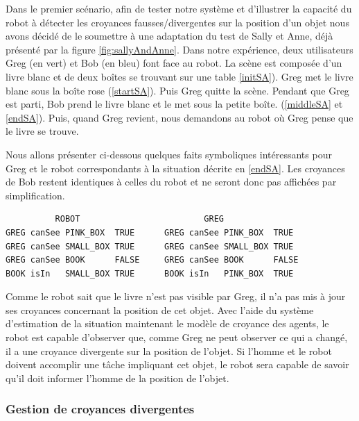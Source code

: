 \documentclass[a4paper,11pt,twoside]{StyleThese}
\begin{document}
Dans le premier scénario, afin de tester notre système et d'illustrer la capacité du robot à détecter les croyances fausses/divergentes sur la position d'un objet nous avons décidé de le soumettre à une adaptation du test de Sally et Anne, déjà présenté par la figure \ref{fig:sallyAndAnne}. Dans notre expérience, deux utilisateurs Greg (en vert) et Bob (en bleu) font face au robot.
La scène est composée d'un livre blanc et de deux boîtes se trouvant sur une table \ref{initSA}).
Greg met le livre blanc sous la boîte rose (\ref{startSA}). Puis Greg quitte la scène. Pendant que Greg est parti, Bob prend le livre blanc et le met sous la petite boîte. (\ref{middleSA} et \ref{endSA}).
Puis, quand Greg revient, nous demandons au robot où Greg pense que le livre se trouve.





Nous allons présenter ci-dessous quelques faits symboliques intéressants pour Greg et le robot correspondants à la situation décrite en \ref{endSA}. Les croyances de Bob restent identiques à celles du robot et ne seront donc pas affichées par simplification.
\begin{scriptsize}
\begin{verbatim}
          ROBOT                         GREG
GREG canSee PINK_BOX  TRUE      GREG canSee PINK_BOX  TRUE
GREG canSee SMALL_BOX TRUE      GREG canSee SMALL_BOX TRUE
GREG canSee BOOK      FALSE     GREG canSee BOOK      FALSE
BOOK isIn   SMALL_BOX TRUE      BOOK isIn   PINK_BOX  TRUE

\end{verbatim}
\end{scriptsize}

Comme le robot sait que le livre n'est pas visible par Greg, il n'a pas mis à jour ses croyances concernant la position de cet objet. Avec l'aide du système d'estimation de la situation maintenant le modèle de croyance des agents, le robot est capable d'observer que, comme Greg ne peut observer ce qui a changé, il a une croyance divergente sur la position de l'objet. Si l'homme et le robot doivent accomplir une tâche impliquant cet objet, le robot sera capable de savoir qu'il doit informer l'homme de la position de l'objet.

\subsubsection{Gestion de croyances divergentes}
\end{document}
